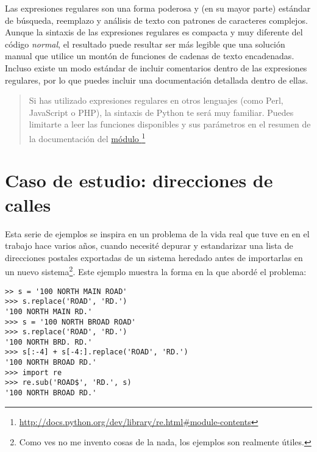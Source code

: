 Las expresiones regulares son una forma poderosa y (en su mayor parte) estándar de búsqueda, reemplazo y análisis de texto con patrones de caracteres complejos. Aunque la sintaxis de las expresiones regulares es compacta y muy diferente del código \emph{normal}, el resultado puede resultar ser más legible que una solución manual que utilice un montón de funciones de cadenas de texto encadenadas. Incluso existe un modo estándar de incluir comentarios dentro de las expresiones regulares, por lo que puedes incluir una documentación detallada dentro de ellas.

\begin{quote}
Si has utilizado expresiones regulares en otros lenguajes (como Perl, JavaScript o PHP), la sintaxis de Python te será muy familiar. Puedes limitarte a leer las funciones disponibles y sus parámetros en el resumen de la documentación del \href{http://docs.python.org/dev/library/re.html\#module-contents}{módulo }\footnote{\href{http://docs.python.org/dev/library/re.html\#module-contents}{http://docs.python.org/dev/library/re.html\#module-contents}}
\end{quote}

\section{Caso de estudio: direcciones de calles}

Esta serie de ejemplos se inspira en un problema de la vida real que tuve en en el trabajo hace varios años, cuando necesité depurar y estandarizar una lista de direcciones postales exportadas de un sistema heredado antes de importarlas en un nuevo sistema\footnote{Como ves no me invento cosas de la nada, los ejemplos son realmente útiles.}. Este ejemplo muestra la forma en la que abordé el problema:

\noindent\begin{minipage}{\textwidth}
\begin{lstlisting}[mathescape=False]
>> s = '100 NORTH MAIN ROAD'
>>> s.replace('ROAD', 'RD.')
'100 NORTH MAIN RD.'
>>> s = '100 NORTH BROAD ROAD'
>>> s.replace('ROAD', 'RD.')
'100 NORTH BRD. RD.'
>>> s[:-4] + s[-4:].replace('ROAD', 'RD.')
'100 NORTH BROAD RD.'
>>> import re
>>> re.sub('ROAD$', 'RD.', s)
'100 NORTH BROAD RD.'
\end{lstlisting}
\end{minipage}

